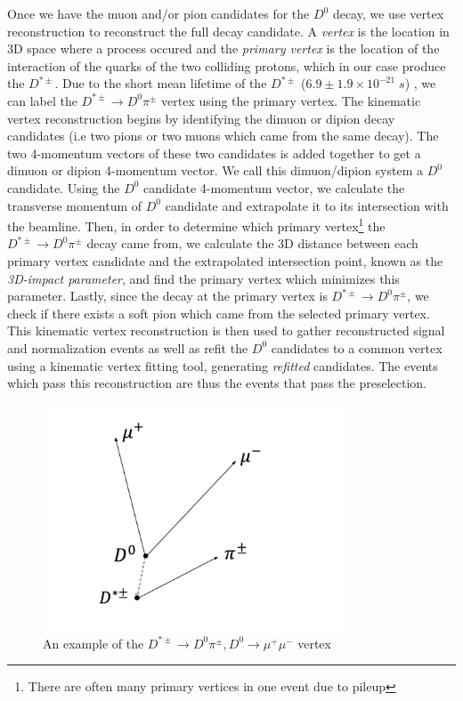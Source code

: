Once we have the muon and/or pion candidates for the $D^0$ decay, we use vertex reconstruction to reconstruct the full decay candidate. A \textit{vertex} is the location in 3D space where a process occured and the \textit{primary vertex} is the location of the interaction of the quarks of the two colliding protons, which in our case produce the $D^{*\pm}$. Due to the short mean lifetime of the $D^{*\pm}$ ($ 6.9 \pm 1.9 \times 10^{-21} \; s$) \cite{ref:pdg2024}, we can label the $D^{*\pm} \to D^0 \pi^\pm$ vertex using the primary vertex. The kinematic vertex reconstruction begins by identifying the dimuon or dipion decay candidates (i.e two pions or two muons which came from the same decay). The two 4-momentum vectors of these two candidates is added together to get a dimuon or dipion 4-momentum vector. We call this dimuon/dipion system a $D^0$ candidate. Using the $D^0$ candidate 4-momentum vector, we calculate the transverse momentum of $D^0$ candidate and extrapolate it to its intersection with the beamline. Then, in order to determine which primary vertex\footnote{There are often many primary vertices in one event due to pileup} the $D^{*\pm} \to D^0 \pi^\pm$ decay came from, we calculate the 3D distance between each primary vertex candidate and the extrapolated intersection point, known as the \textit{3D-impact parameter}, and find the primary vertex which minimizes this parameter. Lastly, since the decay at the primary vertex is $D^{*\pm} \to D^0 \pi^\pm$, we check if there exists a soft pion which came from the selected primary vertex. This kinematic vertex reconstruction is then used to gather reconstructed signal and normalization events as well as refit the $D^0$ candidates to a common vertex using a kinematic vertex fitting tool, generating \textit{refitted} candidates. The events which pass this reconstruction are thus the events that pass the preselection. 

\begin{figure}[htbp]
    \centering
    \includegraphics[width=0.8\textwidth]{figures/chapter4/vertex_reconstruction.png}
    \caption{An example of the $D^{*\pm} \to D^0 \pi^\pm, D^0 \to \mu^+ \mu^-$ vertex}
    \label{fig:vertex_reconstruction}
\end{figure}

